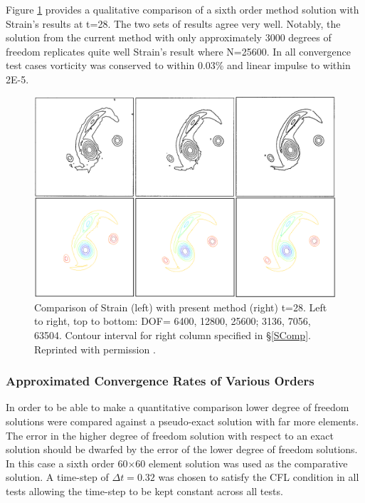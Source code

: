 \documentclass[]{aiaa-tc}%
\begin{document}
Figure \ref{fig:StrainComp} provides a qualitative comparison of a sixth order method solution with Strain's results at t=28. The two sets of results agree very well. Notably, the solution from the current method with only approximately 3000 degrees of freedom replicates quite well Strain's result where N=25600. In all convergence test cases vorticity was conserved to within 0.03\% and linear impulse to within 2E-5.
\begin{figure}[t]
\centering
\includegraphics[width=1\textwidth]{StrainCompR.PNG}
\caption{\label{fig:StrainComp}Comparison of Strain \cite{Strain1996} (left) with present method (right) t=28. Left to right, top to bottom: DOF= 6400, 12800, 25600; 3136, 7056, 63504. Contour interval for right column specified in \S\ref{SComp}. Reprinted with permission \cite{StrainLic}. }
\end{figure}

\subsubsection{Approximated Convergence Rates of Various Orders}\label{SConverge}
In order to be able to make a quantitative comparison lower degree of freedom solutions were compared against a pseudo-exact solution with far more elements. The error in the higher degree of freedom solution with respect to an exact solution should be dwarfed by the error of the lower degree of freedom solutions. In this case a sixth order 60$\times$60 element solution was used as the comparative solution. A time-step of $\Delta t=0.32$ was chosen to satisfy the CFL condition in all tests allowing the time-step to be kept constant across all tests.
\end{document}

